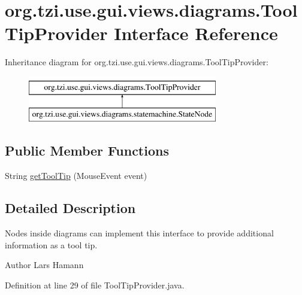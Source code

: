 \hypertarget{interfaceorg_1_1tzi_1_1use_1_1gui_1_1views_1_1diagrams_1_1_tool_tip_provider}{\section{org.\-tzi.\-use.\-gui.\-views.\-diagrams.\-Tool\-Tip\-Provider Interface Reference}
\label{interfaceorg_1_1tzi_1_1use_1_1gui_1_1views_1_1diagrams_1_1_tool_tip_provider}
}
Inheritance diagram for org.\-tzi.\-use.\-gui.\-views.\-diagrams.\-Tool\-Tip\-Provider\-:\begin{figure}[H]
\begin{center}
\leavevmode
\includegraphics[height=2.000000cm]{interfaceorg_1_1tzi_1_1use_1_1gui_1_1views_1_1diagrams_1_1_tool_tip_provider}
\end{center}
\end{figure}
\subsection*{Public Member Functions}
\begin{DoxyCompactItemize}
\item 
String \hyperlink{interfaceorg_1_1tzi_1_1use_1_1gui_1_1views_1_1diagrams_1_1_tool_tip_provider_a70c9018333422929b6f12341c0a320c1}{get\-Tool\-Tip} (Mouse\-Event event)
\end{DoxyCompactItemize}


\subsection{Detailed Description}
Nodes inside diagrams can implement this interface to provide additional information as a tool tip. \begin{DoxyAuthor}{Author}
Lars Hamann 
\end{DoxyAuthor}


Definition at line 29 of file Tool\-Tip\-Provider.\-java.



